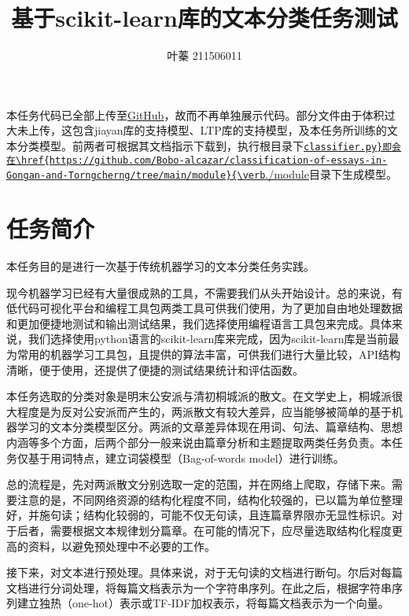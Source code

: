 \documentclass[12pt, a4paper, oneside]{ctexart}
\title{基于scikit-learn库的文本分类任务测试}
\author{叶蓁 211506011}
\date{}
\begin{document}
\maketitle

本任务代码已全部上传至\href{https://github.com/Bobo-alcazar/classification-of-essays-in-Gongan-and-Torngcherng}{GitHub}，故而不再单独展示代码。部分文件由于体积过大未上传，这包含jiayan库的支持模型、LTP库的支持模型，及本任务所训练的文本分类模型。前两者可根据其文档指示下载到，执行根目录下\href{https://github.com/Bobo-alcazar/classification-of-essays-in-Gongan-and-Torngcherng/blob/main/classifier.py}{\verb|classifier.py}即会在\href{https://github.com/Bobo-alcazar/classification-of-essays-in-Gongan-and-Torngcherng/tree/main/module}{\verb|./module}目录下生成模型。

\section{任务简介}

本任务目的是进行一次基于传统机器学习的文本分类任务实践。

现今机器学习已经有大量很成熟的工具，不需要我们从头开始设计。总的来说，有低代码可视化平台和编程工具包两类工具可供我们使用，为了更加自由地处理数据和更加便捷地测试和输出测试结果，我们选择使用编程语言工具包来完成。具体来说，我们选择使用python语言的scikit-learn库来完成，因为scikit-learn库是当前最为常用的机器学习工具包，且提供的算法丰富，可供我们进行大量比较，API结构清晰，便于使用，还提供了便捷的测试结果统计和评估函数。

本任务选取的分类对象是明末公安派与清初桐城派的散文。在文学史上，桐城派很大程度是为反对公安派而产生的，两派散文有较大差异，应当能够被简单的基于机器学习的文本分类模型区分。两派的文章差异体现在用词、句法、篇章结构、思想内涵等多个方面，后两个部分一般来说由篇章分析和主题提取两类任务负责。本任务仅基于用词特点，建立词袋模型（Bag-of-words model）进行训练。

总的流程是，先对两派散文分别选取一定的范围，并在网络上爬取，存储下来。需要注意的是，不同网络资源的结构化程度不同，结构化较强的，已以篇为单位整理好，并施句读；结构化较弱的，可能不仅无句读，且连篇章界限亦无显性标识。对于后者，需要根据文本规律划分篇章。在可能的情况下，应尽量选取结构化程度更高的资料，以避免预处理中不必要的工作。

接下来，对文本进行预处理。具体来说，对于无句读的文档进行断句。尔后对每篇文档进行分词处理，将每篇文档表示为一个字符串序列。在此之后，根据字符串序列建立独热（one-hot）表示或TF-IDF加权表示，将每篇文档表示为一个向量。
\end{document}
